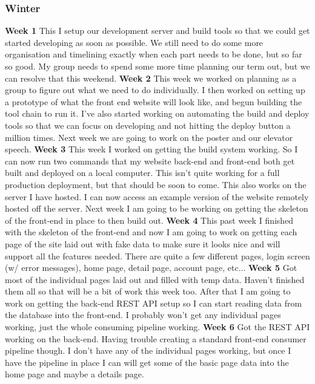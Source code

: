 \documentclass[onecolumn, draftclsnofoot, 10pt, compsoc]{IEEEtran}
\begin{document}
\subsubsection{Winter}
\textbf{Week 1}
This I setup our development server and build tools so that we could get started developing as soon as possible. We still need to do some more organisation and timelining exactly when each part needs to be done, but so far so good. My group needs to spend some more time planning our term out, but we can resolve that this weekend. 
\newline
\textbf{Week 2}
This week we worked on planning as a group to figure out what we need to do individually. I then worked on setting up a prototype of what the front end website will look like, and begun building the tool chain to run it. I've also started working on automating the build and deploy tools so that we can focus on developing and not hitting the deploy button a million times. Next week we are going to work on the poster and our elevator speech.
\newline
\textbf{Week 3}
This week I worked on getting the build system working. So I can now run two commands that my website back-end and front-end both get built and deployed on a local computer. This isn't quite working for a full production deployment, but that should be soon to come. This also works on the server I have hosted. I can now access an example version of the website remotely hosted off the server. Next week I am going to be working on getting the skeleton of the front-end in place to then build out.
\newline
\textbf{Week 4}
This past week I finished with the skeleton of the front-end and now I am going to work on getting each page of the site laid out with fake data to make sure it looks nice and will support all the features needed. There are quite a few different pages, login screen (w/ error messages), home page, detail page, account page, etc...
\newline
\textbf{Week 5}
Got most of the individual pages laid out and filled with temp data. Haven't finished them all so that will be a bit of work this week too. After that I am going to work on getting the back-end REST API setup so I can start reading data from the database into the front-end. I probably won't get any individual pages working, just the whole consuming pipeline working.
\newline
\textbf{Week 6}
Got the REST API working on the back-end. Having trouble creating a standard front-end consumer pipeline though. I don't have any of the individual pages working, but once I have the pipeline in place I can will get some of the basic page data into the home page and maybe a details page.
\end{document}
